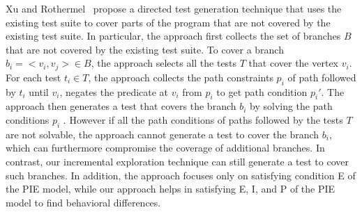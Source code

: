 

Xu and Rothermel~\cite{xu-directed} propose a directed test generation technique that uses 
the existing test suite to cover parts of the program that are not covered by 
the existing test suite. In particular, the approach first collects 
the set of branches $B$ that are not covered by the existing test suite. To cover a branch 
$b_i =<v_i,v_j> \in B$, the approach selects all the tests $T$ that cover the vertex $v_i$. 
For each test $t_i \in T$, the approach collects the path constraints $p_i$ of path followed by $t_i$ until $v_i$, 
negates the predicate at $v_i$ from $p_i$ to get path condition $p_i'$.
The approach then generates a test that covers the branch 
$b_i$ by solving the path conditions $p_i$ . 
However if all the path conditions of paths followed by the tests $T$ are not solvable, the approach cannot 
generate a test to cover the branch $b_i$, which can furthermore compromise the coverage of additional branches.
In contrast, our incremental exploration technique can still generate a test to cover such branches.
In addition, the approach focuses only on satisfying condition E of the PIE model, while our approach
helps in satisfying E, I, and P of the PIE model to find behavioral differences.

%



